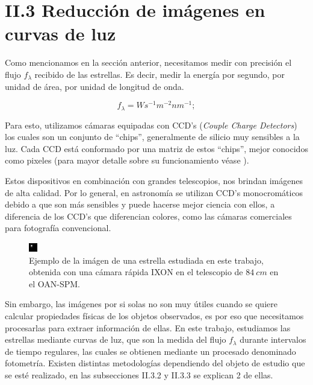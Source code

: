 \section*{II.3 Reducción de imágenes en curvas de luz}

Como mencionamos en la sección anterior, necesitamos medir con precisión el flujo $f_{\lambda}$ recibido de las estrellas. Es decir, medir la energía por segundo, por unidad de área, por unidad de longitud de onda.

\begin{equation}
  \displaystyle f_{\lambda}=W s^{-1}m^{-2}nm^{-1};
\end{equation}

Para esto, utilizamos cámaras equipadas con CCD's (\textit{Couple Charge Detectors}) los cuales son un conjunto de ``chips'', generalmente de silicio muy sensibles a la luz. Cada CCD está conformado por una matriz de estos ``chips'', mejor conocidos como pixeles (para mayor detalle sobre su funcionamiento véase \cite{mortara1981evaluations}).

Estos dispositivos en combinación con grandes telescopios, nos brindan imágenes de alta calidad. Por lo general, en astronomía se utilizan CCD's monocromáticos debido a que son más sensibles y puede hacerse mejor ciencia con ellos, a diferencia de los CCD's que diferencian colores, como las cámaras comerciales para fotografía convencional.

\begin{figure}[h!]
  \centering
    \includegraphics[scale=8]{./figures/wasp74b.png}
   \caption{Ejemplo de la imágen de una estrella estudiada en este trabajo, obtenida con una cámara rápida IXON en el telescopio de $84~cm$ en el OAN-SPM.}
    \label{fig_2_5_wasp74b}
\end{figure}

Sin embargo, las imágenes por si solas no son muy útiles cuando se quiere calcular propiedades físicas de los objetos observados, es por eso que necesitamos procesarlas para extraer información de ellas. En este trabajo, estudiamos las estrellas mediante curvas de luz, que son la medida del flujo $f_{\lambda}$ durante intervalos de tiempo regulares, las cuales se obtienen mediante un procesado denominado fotometría. Existen distintas metodologías dependiendo del objeto de estudio que se esté realizado, en las subsecciones II.3.2 y II.3.3 se explican 2 de ellas.

